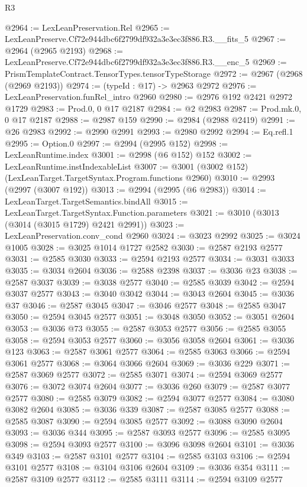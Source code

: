 \begin{lexlean}{R3}
\begin{coremodule}
@2964 := LexLeanPreservation.Rel
@2965 := LexLeanPreserve.Cf72e944dbc6f2799df932a3e3ec3f886.R3.__fits_5
@2967 := @2964 (@2965 @2193)
@2968 := LexLeanPreserve.Cf72e944dbc6f2799df932a3e3ec3f886.R3.__enc_5
@2969 := PrismTemplateContract.TensorTypes.tensorTypeStorage
@2972 := @2967 (@2968 (@2969 @2193))
@2974 := (typeId : @17) -> @2963 @2972
@2976 := LexLeanPreservation.funRel_intro @2960
@2980 := @2976 @192 @2421 @2972 @1729
@2983 := Prod.{0, 0} @17 @2187
@2984 := @2 @2983
@2987 := Prod.mk.{0, 0} @17 @2187
@2988 := @2987 @159
@2990 := @2984 (@2988 @2419)
@2991 := @26 @2983
@2992 := @2990 @2991
@2993 := @2980 @2992
@2994 := Eq.refl.{1}
@2995 := Option.{0}
@2997 := @2994 (@2995 @152)
@2998 := LexLeanRuntime.index
@3001 := @2998 (@6 @152) @152
@3002 := LexLeanRuntime.instIndexableList
@3007 := @3001 (@3002 @152) (LexLeanTarget.TargetSyntax.Program.functions @2960)
@3010 := @2993 (@2997 (@3007 @192))
@3013 := @2994 (@2995 (@6 @2983))
@3014 := LexLeanTarget.TargetSemantics.bindAll
@3015 := LexLeanTarget.TargetSyntax.Function.parameters
@3021 := @3010 (@3013 (@3014 (@3015 @1729) @2421 @2991))
@3023 := LexLeanPreservation.conv_cond @2960
@3024 := @3023 @2992
@3025 := @3024 @1005
@3028 := @3025 @1014 @1727 @2582
@3030 := @2587 @2193 @2577
@3031 := @2585 @3030
@3033 := @2594 @2193 @2577
@3034 := @3031 @3033
@3035 := @3034 @2604
@3036 := @2588 @2398
@3037 := @3036 @23
@3038 := @2587 @3037
@3039 := @3038 @2577
@3040 := @2585 @3039
@3042 := @2594 @3037 @2577
@3043 := @3040 @3042
@3044 := @3043 @2604
@3045 := @3036 @37
@3046 := @2587 @3045
@3047 := @3046 @2577
@3048 := @2585 @3047
@3050 := @2594 @3045 @2577
@3051 := @3048 @3050
@3052 := @3051 @2604
@3053 := @3036 @73
@3055 := @2587 @3053 @2577
@3056 := @2585 @3055
@3058 := @2594 @3053 @2577
@3060 := @3056 @3058 @2604
@3061 := @3036 @123
@3063 := @2587 @3061 @2577
@3064 := @2585 @3063
@3066 := @2594 @3061 @2577
@3068 := @3064 @3066 @2604
@3069 := @3036 @229
@3071 := @2587 @3069 @2577
@3072 := @2585 @3071
@3074 := @2594 @3069 @2577
@3076 := @3072 @3074 @2604
@3077 := @3036 @260
@3079 := @2587 @3077 @2577
@3080 := @2585 @3079
@3082 := @2594 @3077 @2577
@3084 := @3080 @3082 @2604
@3085 := @3036 @339
@3087 := @2587 @3085 @2577
@3088 := @2585 @3087
@3090 := @2594 @3085 @2577
@3092 := @3088 @3090 @2604
@3093 := @3036 @344
@3095 := @2587 @3093 @2577
@3096 := @2585 @3095
@3098 := @2594 @3093 @2577
@3100 := @3096 @3098 @2604
@3101 := @3036 @349
@3103 := @2587 @3101 @2577
@3104 := @2585 @3103
@3106 := @2594 @3101 @2577
@3108 := @3104 @3106 @2604
@3109 := @3036 @354
@3111 := @2587 @3109 @2577
@3112 := @2585 @3111
@3114 := @2594 @3109 @2577

\end{coremodule}
\end{lexlean}

